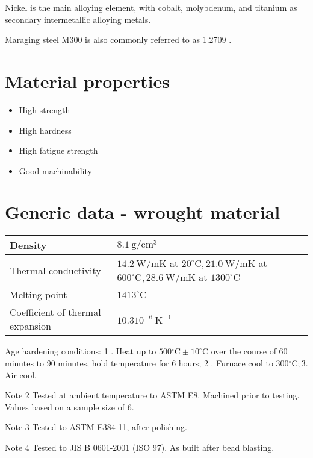 \documentclass[10pt]{article}
\begin{document}
Nickel is the main alloying element, with cobalt, molybdenum, and titanium as secondary intermetallic alloying metals.

Maraging steel M300 is also commonly referred to as 1.2709 .

\section*{Material properties}
\begin{itemize}
  \item High strength

  \item High hardness

  \item High fatigue strength

  \item Good machinability

\end{itemize}

\section*{Generic data - wrought material}
\begin{center}
\begin{tabular}{|l|l|}
\hline
Density & $8.1 \mathrm{~g} / \mathrm{cm}^{3}$ \\
\hline
Thermal conductivity & $14.2 \mathrm{~W} / \mathrm{mK}$ at $20^{\circ} \mathrm{C}, 21.0 \mathrm{~W} / \mathrm{mK}$ at $600^{\circ} \mathrm{C}, 28.6 \mathrm{~W} / \mathrm{mK}$ at $1300^{\circ} \mathrm{C}$ \\
\hline
Melting point & $1413^{\circ} \mathrm{C}$ \\
\hline
Coefficient of thermal expansion & $10.310^{-6} \mathrm{~K}^{-1}$ \\
\hline
\end{tabular}
\end{center}

Age hardening conditions: 1 . Heat up to $500{ }^{\circ} \mathrm{C} \pm 10^{\circ} \mathrm{C}$ over the course of 60 minutes to 90 minutes, hold temperature for 6 hours; 2 . Furnace cool to $300{ }^{\circ} \mathrm{C} ; 3$. Air cool.

Note 2 Tested at ambient temperature to ASTM E8. Machined prior to testing. Values based on a sample size of 6.

Note 3 Tested to ASTM E384-11, after polishing.

Note 4 Tested to JIS B 0601-2001 (ISO 97). As built after bead blasting.
\end{document}
